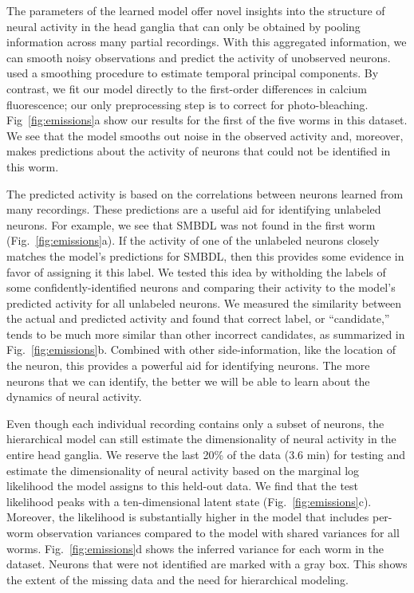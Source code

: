 \documentclass[11pt]{article}
\begin{document}
The parameters of the learned model offer novel insights into the
structure of neural activity in the head ganglia that can only be
obtained by pooling information across many partial recordings.  With
this aggregated information, we can smooth noisy observations and
predict the activity of unobserved neurons. \citet{kato2015global}
used a smoothing procedure to estimate temporal principal components.
By contrast, we fit our model directly to the first-order differences
in calcium fluorescence; our only preprocessing step is to correct for
photo-bleaching. Fig~\ref{fig:emissions}a show our results for the first
of the five worms in this dataset. We see that the model smooths out
noise in the observed activity and, moreover, makes predictions about
the activity of neurons that could not be identified in this worm.

The predicted activity is based on the correlations between neurons
learned from many recordings.  These predictions are a useful aid for
identifying unlabeled neurons.  For example, we see that
\textsf{SMBDL} was not found in the first worm
(Fig.~\ref{fig:emissions}a). If the activity of one of the unlabeled
neurons closely matches the model's predictions for \textsf{SMBDL},
then this provides some evidence in favor of assigning it this
label. We tested this idea by witholding the labels of some
confidently-identified neurons and comparing their activity to the
model's predicted activity for all unlabeled neurons.  We measured the
similarity between the actual and predicted activity and found that
correct label, or ``candidate,'' tends to be much more similar than
other incorrect candidates, as summarized in
Fig.~\ref{fig:emissions}b.  Combined with other side-information, like
the location of the neuron, this provides a powerful aid for identifying
neurons.  The more neurons that we can identify, the better we will be
able to learn about the dynamics of neural activity.

Even though each individual recording contains only a subset of neurons,
the hierarchical model can still estimate the dimensionality of
neural activity in the entire head ganglia.  We reserve the last 20\% of
the data (3.6 min) for testing and estimate the dimensionality
of neural activity based on the marginal log likelihood the model assigns
to this held-out data. We find that the test likelihood peaks with a
ten-dimensional latent state (Fig.~\ref{fig:emissions}c).  Moreover, the likelihood is substantially
higher in the model that includes per-worm observation variances
compared to the model with shared variances for all worms. Fig.~\ref{fig:emissions}d
shows the inferred variance for each worm in the \citet{kato2015global}
dataset.  Neurons that were not identified are marked with a gray box.
This shows the extent of the missing data and the need for hierarchical
modeling.
\end{document}
